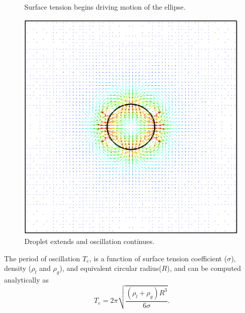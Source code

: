 \begin{figure}[htbp]
\begin{minipage}{0.3\textwidth}
		\caption{Surface tension begins driving motion of the ellipse.}
		\label{fig:Odrop2}
	\end{minipage}
\hfill
\begin{minipage}{0.3\textwidth}
	\centering
	\includegraphics[width=1.0\linewidth]{figs/Odrop3}
	\caption{Droplet extends and oscillation continues.}
	\label{fig:Odrop3}
\end{minipage}
\end{figure}
The period of oscillation $T_{e}$, is a function of surface tension coefficient ($\sigma$), density ($\rho_l$ and $\rho_g$), and equivalent circular radius($R$), and can be computed analytically as~\cite{Rayleigh}
\begin{equation}
T_{e} = 2 \pi \sqrt{\frac{(\rho_{l}+\rho_{g})R^3}{6\sigma}}.
\label{period}
\end{equation}

